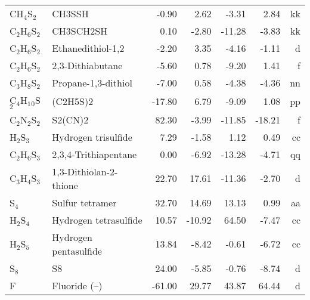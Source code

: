 \begin{table}
\begin{center}
\begin{tabular}{llrrrrr}
 CH$_4$S$_2$       & CH3SSH                          &    -0.90    &     2.62  &    -3.31  &     2.84  &     kk\\
 C$_2$H$_6$S$_2$      & CH3SCH2SH                       &     0.10    &    -2.80  &   -11.28  &    -3.83  &     kk\\
 C$_2$H$_6$S$_2$      & Ethanedithiol-1,2               &    -2.20    &     3.35  &    -4.16  &    -1.11  &      d\\
 C$_2$H$_6$S$_2$      & 2,3-Dithiabutane                &    -5.60    &     0.78  &    -9.20  &     1.41  &      f\\
 C$_3$H$_8$S$_2$      & Propane-1,3-dithiol             &    -7.00    &     0.58  &    -4.38  &    -4.36  &     nn\\
 C$_4$H$_1$$_0$S$_2$     & (C2H5S)2                        &   -17.80    &     6.79  &    -9.09  &     1.08  &     pp\\
 C$_2$N$_2$S$_2$      & S2(CN)2                         &    82.30    &    -3.99  &   -11.85  &   -18.21  &      f\\
 H$_2$S$_3$        & Hydrogen trisulfide             &     7.29    &    -1.58  &     1.12  &     0.49  &     cc\\
 C$_2$H$_6$S$_3$      & 2,3,4-Trithiapentane            &     0.00    &    -6.92  &   -13.28  &    -4.71  &     qq\\
 C$_3$H$_4$S$_3$      & 1,3-Dithiolan-2-thione          &    22.70    &    17.61  &   -11.36  &    -2.70  &      d\\
 S$_4$          & Sulfur tetramer                 &    32.70    &    14.69  &    13.13  &     0.99  &     aa\\
 H$_2$S$_4$        & Hydrogen tetrasulfide           &    10.57    &   -10.92  &    64.50  &    -7.47  &     cc\\
 H$_2$S$_5$        & Hydrogen pentasulfide           &    13.84    &    -8.42  &    -0.61  &    -6.72  &     cc\\
 S$_8$          & S8                              &    24.00    &    -5.85  &    -0.76  &    -8.74  &      d\\
 F           & Fluoride (--)                    &   -61.00    &    29.77  &    43.87  &    64.44  &      d\\
\hline
\end{tabular}
\end{center}
\end{table}
\clearpage

